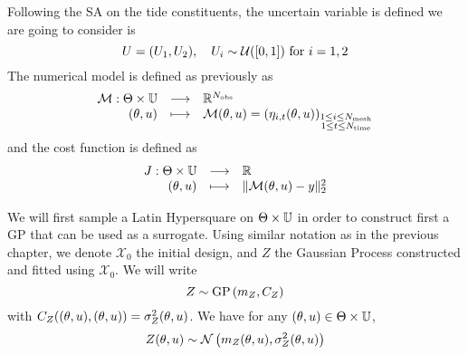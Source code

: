 \documentclass[../../Main_ManuscritThese.tex]{subfiles}
\begin{document}
  Following the SA on the tide constituents, the uncertain variable is
  defined we are going to consider is
\begin{equation}
  \UU = (\UU_1,\UU_2), \quad \UU_i \sim \mathcal{U}(\interval{0}{1}) \text{ for } i=1,2
\end{equation}
The numerical model is defined as previously as
\begin{equation}
  \begin{array}{rcl}
    \mathcal{M}: \Theta \times \mathbb{U} &\longrightarrow& \mathbb{R}^{N_{\mathrm{obs}}} \\
    (\theta, u)& \longmapsto & \mathcal{M}(\theta, u) = \left(\eta_{i,t}(\theta, u)\right)_{\substack{1 \leq i \leq N_{\mathrm{mesh}} \\ 1 \leq t \leq N_{\mathrm{time}}}} \\ 
  \end{array}
\end{equation}
and the cost function is defined as
\begin{equation}
  \begin{array}{rcl}
    J: \Theta \times \mathbb{U} & \longrightarrow & \mathbb{R} \\
    (\theta, u) & \longmapsto & \|\mathcal{M}(\theta, u) - y \|^2_2
  \end{array}
\end{equation}

We will first sample a Latin Hypersquare on
$\Theta \times \mathbb{U}$ in order to construct first a GP that can be
used as a surrogate. Using similar notation as in the previous
chapter, we denote $\mathcal{X}_0$ the initial design, and $Z$ the
Gaussian Process constructed and fitted using
$\mathcal{X}_0$.
We will write
\begin{equation}
  Z \sim \operatorname{\mathrm{GP}}\left(m_Z, C_Z\right)
\end{equation}
with $C_Z((\theta, u),(\theta, u)) = \sigma^2_Z(\theta, u)$. We have for
any $(\theta, u) \in \Theta\times\mathbb{U}$,
\begin{equation}
  Z(\theta, u) \sim \mathcal{N}\left(m_Z(\theta, u), \sigma^2_Z(\theta, u)\right)
\end{equation}
\end{document}
